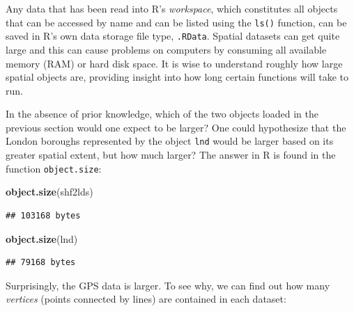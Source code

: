 \documentclass[]{article}
\newenvironment{Shaded}{}{}
\newcommand{\KeywordTok}[1]{\textcolor[rgb]{0.00,0.44,0.13}{\textbf{{#1}}}}
\newcommand{\NormalTok}[1]{{#1}}
\begin{document}
Any data that has been read into R's \emph{workspace}, which constitutes
all objects that can be accessed by name and can be listed using the
\texttt{ls()} function, can be saved in R's own data storage file type,
\texttt{.RData}. Spatial datasets can get quite large and this can cause
problems on computers by consuming all available memory (RAM) or hard
disk space. It is wise to understand roughly how large spatial objects
are, providing insight into how long certain functions will take to run.

In the absence of prior knowledge, which of the two objects loaded in
the previous section would one expect to be larger? One could
hypothesize that the London boroughs represented by the object
\texttt{lnd} would be larger based on its greater spatial extent, but
how much larger? The answer in R is found in the function
\texttt{object.size}:

\begin{Shaded}
\begin{Highlighting}[]
\KeywordTok{object.size}\NormalTok{(shf2lds)}
\end{Highlighting}
\end{Shaded}
\begin{verbatim}
## 103168 bytes
\end{verbatim}
\begin{Shaded}
\begin{Highlighting}[]
\KeywordTok{object.size}\NormalTok{(lnd)}
\end{Highlighting}
\end{Shaded}
\begin{verbatim}
## 79168 bytes
\end{verbatim}
Surprisingly, the GPS data is larger. To see why, we can find out how
many \emph{vertices} (points connected by lines) are contained in each
dataset:
\end{document}
